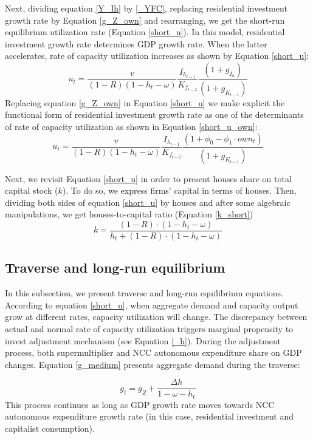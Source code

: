 \documentclass[12pt, a4]{article}
\begin{document}
Next, dividing equation \ref{Y_Ih} by \ref{_YFC},  replacing residential investment growth rate by Equation \ref{g_Z_own}  and rearranging, we get the short-run equilibrium utilization rate (Equation \ref{short_u}).
In this model, residential investment growth rate determines GDP growth rate.
When the latter accelerates, rate of capacity utilization increases as shown by Equation \ref{short_u}:
\begin{equation}
\label{short_u}
u_t = \frac{v}{(1-R)(1-h_t - \omega)}\frac{I_{h_{t-1}}}{K_{f_{t-2}}}\frac{(1 + g_{I_h})}{(1+g_{K_{t-1}})}
\end{equation}
Replacing equation \ref{g_Z_own} in Equation \ref{short_u} we make explicit the functional form of residential investment growth rate as one of the determinants of rate of capacity utilization as shown in Equation \ref{short_u_own}:
\begin{equation}
\label{short_u_own}
u_t = \frac{v}{(1-R)(1-h_t - \omega)}\frac{I_{h_{t-1}}}{K_{f_{t-2}}}\frac{(1 + \phi_0 - \phi_1\cdot own_t)}{(1+g_{K_{t-1}})}
\end{equation}

Next, we revisit Equation \ref{short_u} in order to present houses share on total capital stock (\(k\)).
To do so, we express firms' capital in terms of houses. 
Then, dividing both sides of equation \ref{short_u} by houses and after some algebraic manipulations, we get houses-to-capital ratio (Equation \ref{k_short})
\begin{equation}
\label{k_short}
k = \frac{(1-R)\cdot (1-h_t - \omega)}{h_t + (1-R)\cdot (1-h_t - \omega)}
\end{equation}

\subsection{Traverse and long-run equilibrium}
\label{sec:org31914fd}
\label{long}

In this subsection, we present traverse and long-run equilibrium equations.
According to equation \ref{short_u}, when aggregate demand and capacity output grow at different rates, capacity utilization will change. 
The discrepancy between actual and normal rate of capacity utilization triggers marginal propensity to invest adjustment mechanism (see Equation \ref{_h}). 
During the adjustment process, both supermultiplier and NCC autonomous expenditure share on GDP changes.
Equation \ref{g_medium} presents aggregate demand during the traverse:

\begin{equation}
\label{g_medium}
g_t = g_{Z} + \frac{\Delta h}{1 - \omega - h_{t}}
\end{equation}
This process continues as long as GDP growth rate moves towards NCC autonomous expenditure growth rate (in this case, residential investment and capitalist consumption). 
\end{document}

